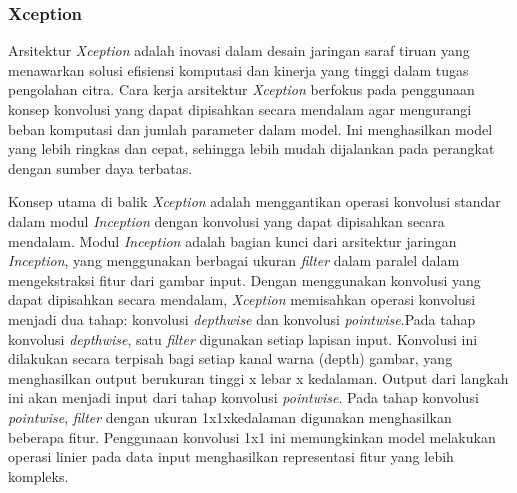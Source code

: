 \subsubsection{Xception}
Arsitektur \textit{Xception} adalah inovasi dalam desain jaringan saraf tiruan yang menawarkan solusi efisiensi komputasi dan kinerja yang tinggi dalam tugas pengolahan citra. Cara kerja arsitektur \textit{Xception} berfokus pada penggunaan konsep konvolusi yang dapat dipisahkan secara mendalam agar mengurangi beban komputasi dan jumlah parameter dalam model. Ini menghasilkan model yang lebih ringkas dan cepat, sehingga lebih mudah dijalankan pada perangkat dengan sumber daya terbatas.

Konsep utama di balik \textit{Xception} adalah menggantikan operasi konvolusi standar dalam modul \textit{Inception} dengan konvolusi yang dapat dipisahkan secara mendalam. Modul \textit{Inception} adalah bagian kunci dari arsitektur jaringan \textit{Inception}, yang menggunakan berbagai ukuran \textit{filter} dalam paralel dalam mengekstraksi fitur dari gambar input. Dengan menggunakan konvolusi yang dapat dipisahkan secara mendalam, \textit{Xception} memisahkan operasi konvolusi menjadi dua tahap: konvolusi \textit{depthwise} dan konvolusi \textit{pointwise}.Pada tahap konvolusi \textit{depthwise}, satu \textit{filter} digunakan setiap lapisan input. Konvolusi ini dilakukan secara terpisah bagi setiap kanal warna (depth) gambar, yang menghasilkan output berukuran tinggi x lebar x kedalaman. Output dari langkah ini akan menjadi input dari tahap konvolusi \textit{pointwise}. Pada tahap konvolusi \textit{pointwise}, \textit{filter} dengan ukuran 1x1xkedalaman digunakan menghasilkan beberapa fitur. Penggunaan konvolusi 1x1 ini memungkinkan model melakukan operasi linier pada data input menghasilkan representasi fitur yang lebih kompleks.

